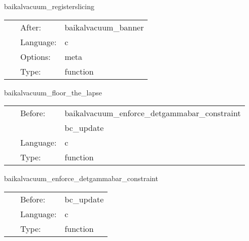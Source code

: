 \vspace{5mm}


\hspace{5mm} baikalvacuum\_registerslicing 

\hspace{5mm}{\it register 3+1 slicing condition } 


\hspace{5mm}

 \begin{tabular*}{160mm}{cll} 
~ & After:  & baikalvacuum\_banner \\ 
~ & Language:  & c \\ 
~ & Options:  & meta \\ 
~ & Type:  & function \\ 
\end{tabular*} 


\vspace{5mm}


\hspace{5mm} baikalvacuum\_floor\_the\_lapse 

\hspace{5mm}{\it set lapse = max(lapse\_floor, lapse) } 


\hspace{5mm}

 \begin{tabular*}{160mm}{cll} 
~ & Before:  & baikalvacuum\_enforce\_detgammabar\_constraint \\ 
~& ~ &bc\_update\\ 
~ & Language:  & c \\ 
~ & Type:  & function \\ 
\end{tabular*} 


\vspace{5mm}


\hspace{5mm} baikalvacuum\_enforce\_detgammabar\_constraint 

\hspace{5mm}{\it enforce detgammabar = detgammahat (= 1 in cartesian) } 


\hspace{5mm}

 \begin{tabular*}{160mm}{cll} 
~ & Before:  & bc\_update \\ 
~ & Language:  & c \\ 
~ & Type:  & function \\ 
\end{tabular*} 


